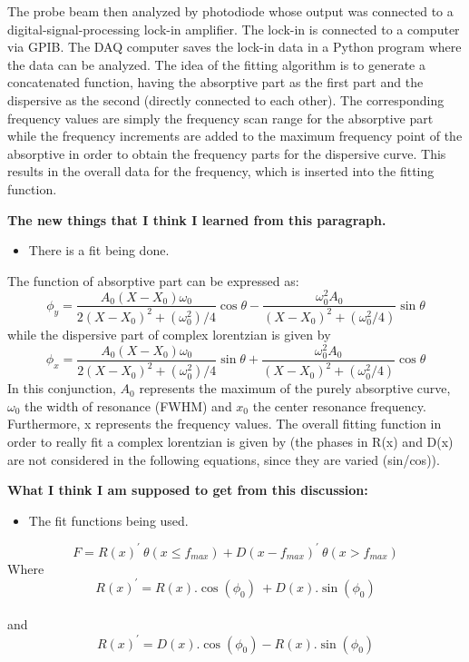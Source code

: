 The probe beam then analyzed by photodiode whose output was connected
to a digital-signal-processing lock-in amplifier. The lock-in is
connected to a computer via GPIB. The DAQ computer saves the lock-in
data in a Python program where the data can be analyzed. The idea of
the fitting algorithm is to generate a concatenated function, having
the absorptive part as the first part and the dispersive as the second
(directly connected to each other). The corresponding frequency values
are simply the frequency scan range for the absorptive part while the
frequency increments are added to the maximum frequency point of the
absorptive in order to obtain the frequency parts for the dispersive
curve. This results in the overall data for the frequency, which is
inserted into the fitting function.

{\bf The new things that I think I learned from this paragraph.}
\begin{itemize}
\item There is a fit being done.
\end{itemize}


The function of absorptive part can be expressed as:
\begin{equation}
\phi_y= \frac{A_0 (X-X_0 )\omega_0}{2(X-X_0 )^2+(\omega_0^2)/4}\cos\theta-\frac{\omega_0^2A_0}{(X-X_0 )^2+(\omega_0^2/4)}\sin\theta
\end{equation}
while the dispersive part of complex lorentzian is given by
\begin{equation}
\phi_x= \frac{A_0 (X-X_0 )\omega_0}{2(X-X_0 )^2+(\omega_0^2)/4}\sin\theta+\frac{\omega_0^2A_0}{(X-X_0 )^2+(\omega_0^2/4)}\cos\theta
\end{equation}
In this conjunction, $A_0$ represents the maximum of the purely
absorptive curve, $\omega_0$ the width of resonance (FWHM) and $x_0$
the center resonance frequency. Furthermore, x represents the
frequency values.  The overall fitting function in order to really fit
a complex lorentzian is given by (the phases in R(x) and D(x) are not
considered in the following equations, since they are varied
(sin/cos)).

{\bf What I think I am supposed to get from this discussion:}
\begin{itemize}
\item The fit functions being used.
\end{itemize}


\begin{equation}
F = R(x)^{'}~\theta(x \leq f_{max}) + D(x-f_{max})^{'}~\theta(x > f_{max})
\label{equation:fit funtion}
\end{equation}
Where 
\begin{equation}
R(x)^{'}=R(x) . \cos(\phi_0)~ + D(x) .\sin(\phi_0)
\end{equation}\\
and
\begin{equation}
R(x)^{'}=D(x) . \cos(\phi_0) - R(x) .\sin(\phi_0)
\end{equation}

